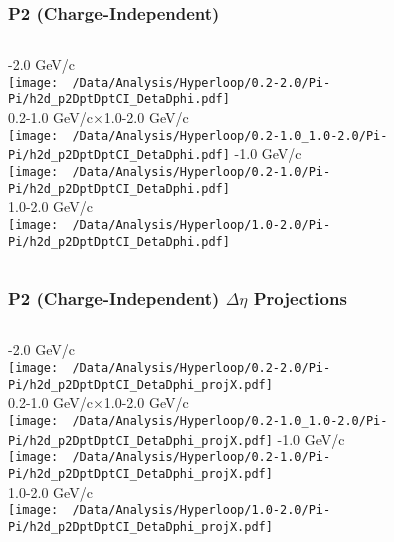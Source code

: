 \documentclass{beamer}
\begin{document}
\begin{frame}
	\frametitle{P2 (Charge-Independent)}
	\begin{columns}
		-2.0 GeV/c\\
		\texttt{[image: ~/Data/Analysis/Hyperloop/0.2-2.0/Pi-Pi/h2d\_p2DptDptCI\_DetaDphi.pdf]}\\0.2-1.0 GeV/c$\times$1.0-2.0 GeV/c\\
		\texttt{[image: ~/Data/Analysis/Hyperloop/0.2-1.0\_1.0-2.0/Pi-Pi/h2d\_p2DptDptCI\_DetaDphi.pdf]}
		-1.0 GeV/c\\
		\texttt{[image: ~/Data/Analysis/Hyperloop/0.2-1.0/Pi-Pi/h2d\_p2DptDptCI\_DetaDphi.pdf]}\\1.0-2.0 GeV/c\\
		\texttt{[image: ~/Data/Analysis/Hyperloop/1.0-2.0/Pi-Pi/h2d\_p2DptDptCI\_DetaDphi.pdf]}
	\end{columns}
\end{frame}
\begin{frame}
	\frametitle{P2 (Charge-Independent) $\Delta\eta$ Projections}
	\begin{columns}
		\column{0.5\textwidth}
		-2.0 GeV/c\\
		\texttt{[image: ~/Data/Analysis/Hyperloop/0.2-2.0/Pi-Pi/h2d\_p2DptDptCI\_DetaDphi\_projX.pdf]}\\0.2-1.0 GeV/c$\times$1.0-2.0 GeV/c\\
		\texttt{[image: ~/Data/Analysis/Hyperloop/0.2-1.0\_1.0-2.0/Pi-Pi/h2d\_p2DptDptCI\_DetaDphi\_projX.pdf]}
		\column{0.5\textwidth}
		-1.0 GeV/c\\
		\texttt{[image: ~/Data/Analysis/Hyperloop/0.2-1.0/Pi-Pi/h2d\_p2DptDptCI\_DetaDphi\_projX.pdf]}\\1.0-2.0 GeV/c\\
		\texttt{[image: ~/Data/Analysis/Hyperloop/1.0-2.0/Pi-Pi/h2d\_p2DptDptCI\_DetaDphi\_projX.pdf]}
	\end{columns}
\end{frame}
\end{document}
